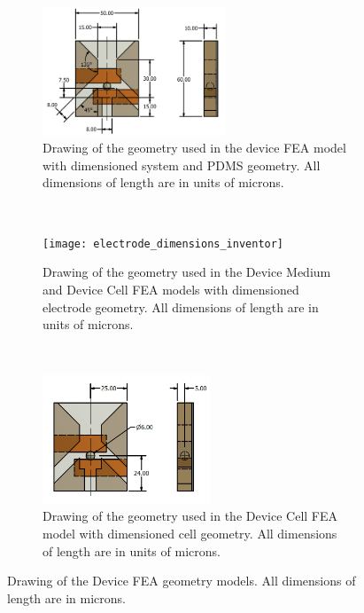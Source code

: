  \begin{figure}[H]
    \centering
    \begin{subfigure}[b]{\textwidth}
      \centering
    \includegraphics[width=0.6\textwidth]{images/channel_dimensions_inventor.png}
    \caption[]{Drawing of the geometry used in the device FEA model with dimensioned system and PDMS geometry. All dimensions of length are in units of microns.}
    \label{fig:device_channel_dimensions_FEA}
    \end{subfigure}
    \\
    \vspace{0.1 in}
    \begin{subfigure}[b]{\textwidth}
        \centering
        \texttt{[image: electrode\_dimensions\_inventor]}
       \caption{Drawing of the geometry used in the Device Medium and Device Cell FEA models with dimensioned electrode geometry. All dimensions of length are in units of microns.}
        \label{fig:device_electrode_dimensions_FEA}
    \end{subfigure} 
    \\
    \vspace{0.1 in}
    \begin{subfigure}[b]{\textwidth}
        \centering
        \includegraphics[width=0.55\textwidth]{images/particle_dimension_inventor.png}
        \caption{Drawing of the geometry used in the Device Cell FEA model with dimensioned cell geometry. All dimensions of length are in units of microns.}
        \label{fig:device_cell_dimensions_FEA}
    \end{subfigure} 
    \caption[Device FEA model geometry.]{Drawing of the Device FEA geometry models. All dimensions of length are in microns.}
    \label{fig: FEA_device_geometry}
 \end{figure}

